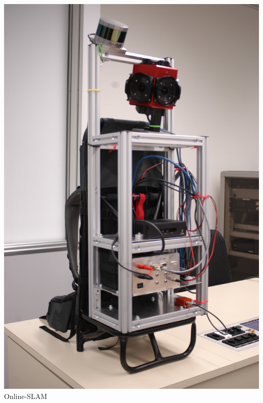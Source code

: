 \documentclass[aspectratio=169]{beamer}
\begin{document}
\begin{frame}
\begin{columns}[onlytextwidth]
\begin{column}{0.33\textwidth}
      \includegraphics[height=0.7\textheight]{./Abbildungen/cappro_3.JPG}
      \\
      Online-SLAM
    \end{column}
  \end{columns}
\end{frame}
\end{document}
